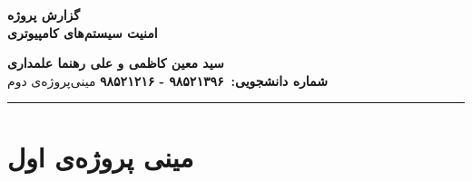 \def \Subject {گزارش پروژه}
\def \Course {امنیت سیستم‌های کامپیوتری}
\def \Author {سید معین کاظمی و علی رهنما علمداری}
\def \Report {مینی‌پروژه‌ی دوم}
\def \StudentNumber {۹۸۵۲۱۳۹۶ - ۹۸۵۲۱۲۱۶}
\begin{center}
\vspace{.4cm}
{\bf {\huge \Subject}}\\
{\bf \Large \Course}
\vspace{.2cm}
\end{center}
{\bf \Author }  \\
{\bf شماره دانشجویی:\ \StudentNumber}
\hspace{\fill} 
{\Large \Report} \\
\hrule
\vspace{0.8cm}
\clearpage
\section{مینی پروژه‌ی اول}
